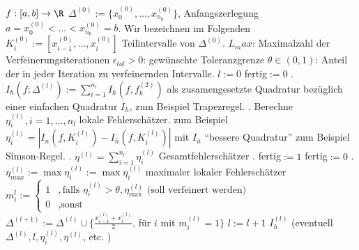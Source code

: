 \documentclass[11pt]{scrartcl}
\begin{document}
\begin{alg*}
	\begin{algorithmic}
		\Require $f:[a,b]\to \R$
		\Require $\Delta^{(0)}:=\{x_0^{(0)},..., x_{n_0}^{(0)}\}$, Anfangszerlegung $a=x_0^{(0)}<...<x_{n_0}^{(0)}=b$. 
		Wir bezeichnen im Folgenden $K_i^{(0)}:=[x_{i-1}^{(0)},..., x_{i}^{(0)}]$ Teilintervalle von $\Delta^{(0)}$.
		\Require $L_max$: Maximalzahl der Verfeinerungsiterationen
		\Require $\epsilon_{tol}>0$: gewünschte Toleranzgrenze
		\Require $\theta\in (0,1)$: Anteil der in jeder Iteration zu verfeinernden Intervalle.
		\State $l:=0$
		\State fertig$:= 0$ %
		. $I_h(f; \Delta^{(l)}):= \sum_{i=1}^{n_l} I_h (f, f_{k}^{(2)})$ als zusamengesetzte Quadratur bezüglich einer einfachen Quadratur $I_h$, zum Beispiel Trapezregel.
		. Berechne $\eta_i^{(l)}, i=1,..., n_l$ lokale Fehlerschätzer. zum Beispiel $\eta_i^{(l)}=|I_n(f, K_i^{(l)})- I_{\hat n} (f, K_i^{(l)})|$ mit $I_{\hat n}$ "`bessere Quadratur"' zum Beispiel Simson-Regel.
		. $\eta^{(l)}=\sum_{i=1}^{n_l} \eta_i^{(l)}$ Gesamtfehlerschätzer
		.
		 fertig$:= 1$ \Else fertig$:=0$ \EndIf
		. 
		\State $\eta_{max}^{(l)}:= \max \eta_i^{(l)}:= \max \eta_i^{(l)}$ maximaler lokaler Fehlerschätzer
		\State $m_i^{l}:=\begin{cases} 1 &, \text{falls $\eta_i^{(l)}>\theta, \eta_{\max}^{(l)}$ (soll verfeinert werden)}\\ 0 &, \text{sonst}\end{cases}$
		\State $\Delta^{(l+1)}:= \Delta^{(l)} \cup \{ \frac{x_{i-1}^{(l)}+x_{i}^{(l)}}{2}$, für $i$ mit $m_i^{(l)}=1\}$
		\State $l:=l+1$
		\EndIf 
		\EndWhile
		\Return $I_h^{(l)}$ (eventuell $\Delta^{(l)}, l, \eta_i^{(l)}, \eta^{(l)}$, etc. )
	\end{algorithmic}
\end{alg*}
\end{document}
